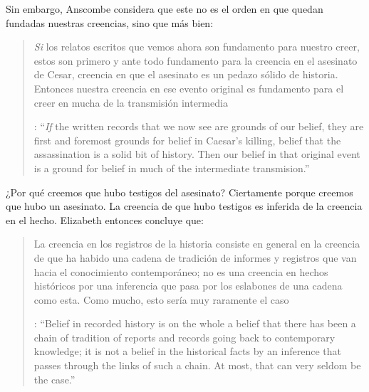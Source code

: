 \label{subsec:notchain}
Sin embargo, Anscombe considera que este no es el orden en que quedan fundadas nuestras creencias, sino que más bien: \blockquote[{\cite[88]{anscombe1981parmenides:humeandjulius}}: \enquote{\emph{If} the written records that we now see are grounds of our belief, they are first and foremost grounds for belief in Caesar's killing, belief that the assassination is a solid bit of history. Then our belief in that original event is a ground for belief in much of the intermediate transmision.}]{\emph{Si} los relatos escritos que vemos ahora son fundamento para nuestro creer, estos son primero y ante todo fundamento para la creencia en el asesinato de Cesar, creencia en que el asesinato es un pedazo sólido de historia. Entonces nuestra creencia en ese evento original es fundamento para el creer en mucha de la transmisión intermedia}. ¿Por qué creemos que hubo testigos del asesinato? Ciertamente porque creemos que hubo un asesinato. La creencia de que hubo testigos es inferida de la creencia en el hecho.
Elizabeth entonces concluye que: \blockquote[{\cite[89]{anscombe1981parmenides:humeandjulius}}: \enquote{Belief in recorded history is on the whole a belief that there has been a chain of tradition of reports and records going back to contemporary knowledge; it is not a belief in the historical facts by an inference that passes through the links of such a chain. At most, that can very seldom be the case.}]{La creencia en los registros de la historia consiste en general en la creencia de que ha habido una cadena de tradición de informes y registros que van hacia el conocimiento contemporáneo; no es una creencia en hechos históricos por una inferencia que pasa por los eslabones de una cadena como esta. Como mucho, esto sería muy raramente el caso}.



